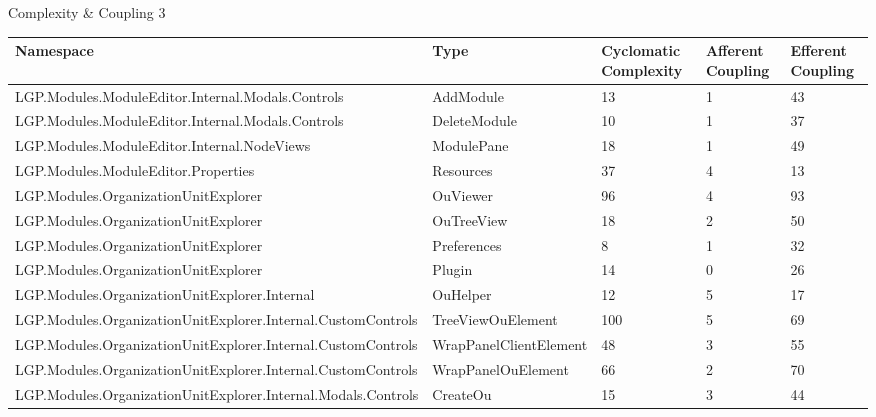\begin{table}[h!t]
				\caption{Complexity \& Coupling 3}			
				\label{tab:ComplexityCoupling3}
				
			\end{table}
			
		\newpage
			
			\begin{table}[h!t]
				\footnotesize{\begin{tabular}{ | p{82mm} | p{32mm} | p{10mm} | p{10mm} | p{10mm} | }	
																						\hline
				Namespace & Type  & Cyclomatic Complexity & Afferent Coupling & Efferent Coupling  \\ \hline				
				LGP.Modules.ModuleEditor.Internal.Modals.Controls & AddModule & 13    & 1     & 43  \\ \hline
				LGP.Modules.ModuleEditor.Internal.Modals.Controls & DeleteModule & 10    & 1     & 37  \\ \hline
				LGP.Modules.ModuleEditor.Internal.NodeViews & ModulePane & 18    & 1     & \cellcolor{ored}49  \\ \hline
				LGP.Modules.ModuleEditor.Properties & Resources & 37    & 4     & 13  \\ \hline
				LGP.Modules.OrganizationUnitExplorer & OuViewer & \cellcolor{ored}96    & 4     & \cellcolor{ored}93  \\ \hline
				LGP.Modules.OrganizationUnitExplorer & OuTreeView & 18    & 2     & \cellcolor{ored}50  \\ \hline
				LGP.Modules.OrganizationUnitExplorer & Preferences & 8     & 1     & 32  \\ \hline
				LGP.Modules.OrganizationUnitExplorer & Plugin & 14    & 0     & 26  \\ \hline
				LGP.Modules.OrganizationUnitExplorer.Internal & OuHelper & 12    & 5     & 17  \\ \hline
				LGP.Modules.OrganizationUnitExplorer.Internal.CustomControls & TreeViewOuElement & \cellcolor{ored}100   & 5     & \cellcolor{ored}69  \\ \hline
				LGP.Modules.OrganizationUnitExplorer.Internal.CustomControls & WrapPanelClientElement & \cellcolor{ored}48    & 3     & \cellcolor{ored}55  \\ \hline
				LGP.Modules.OrganizationUnitExplorer.Internal.CustomControls & WrapPanelOuElement & \cellcolor{ored}66    & 2     & \cellcolor{ored}70  \\ \hline
				LGP.Modules.OrganizationUnitExplorer.Internal.Modals.Controls & CreateOu & 15    & 3     & \cellcolor{ored}44  \\ \hline

\end{tabular}}
\end{table}
